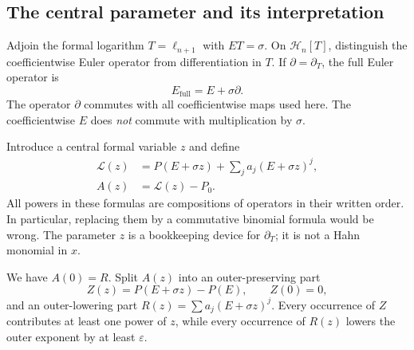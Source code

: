 \documentclass[11pt,a4paper]{article}
\numberwithin{equation}{section}
\theoremstyle{definition}
\theoremstyle{remark}
\theoremstyle{definition}
\newcommand{\Hh}{\mathcal H}
\newcommand{\Ll}{\mathcal L}
\newcommand{\eps}{\varepsilon}
\begin{document}
\subsection{The central parameter and its interpretation}
Adjoin the formal logarithm $T=\ell_{n+1}$ with $ET=\sigma$. On $\Hh_n[T]$, distinguish the coefficientwise Euler operator from differentiation in $T$. If $\partial=\partial_T$, the full Euler operator is
\begin{equation}
 E_{\mathrm{full}}=E+\sigma\partial.
 \label{eq:Efull}
\end{equation}
The operator $\partial$ commutes with all coefficientwise maps used here. The coefficientwise $E$ does \emph{not} commute with multiplication by $\sigma$.

Introduce a central formal variable $z$ and define
\begin{align}
 \Ll(z)&=P(E+\sigma z)+\sum_j a_j(E+\sigma z)^j,\label{eq:Lz}\\
 A(z)&=\Ll(z)-P_0.
 \label{eq:Az}
\end{align}
All powers in these formulas are compositions of operators in their written order. In particular, replacing them by a commutative binomial formula would be wrong. The parameter $z$ is a bookkeeping device for $\partial_T$; it is not a Hahn monomial in $x$.

We have $A(0)=R$. Split $A(z)$ into an outer-preserving part
\[
 Z(z)=P(E+\sigma z)-P(E),\qquad Z(0)=0,
\]
and an outer-lowering part $R(z)=\sum a_j(E+\sigma z)^j$. Every occurrence of $Z$ contributes at least one power of $z$, while every occurrence of $R(z)$ lowers the outer exponent by at least $\eps$.
\end{document}
